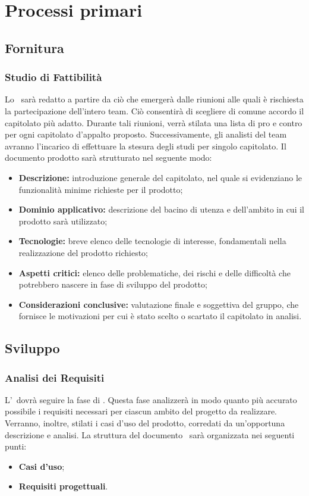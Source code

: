 \newpage
\section{Processi primari}

\subsection{Fornitura}

\subsubsection{Studio di Fattibilità}
Lo \SdF\ sarà redatto a partire da ciò che emergerà dalle riunioni alle quali è rischiesta la partecipazione dell'intero team. Ciò consentirà di scegliere di comune accordo il capitolato più adatto. Durante tali riunioni, verrà stilata una lista di pro e contro per ogni capitolato d'appalto proposto. Successivamente, gli analisti del team avranno l'incarico di effettuare la stesura degli studi per singolo capitolato. Il documento prodotto sarà strutturato nel seguente modo:

\begin{itemize}
	\item \textbf{Descrizione:} introduzione generale del capitolato, nel quale si evidenziano le funzionalità minime richieste per il prodotto;
	\item \textbf{Dominio applicativo:} descrizione del bacino di utenza e dell'ambito in cui il prodotto sarà utilizzato;
	\item \textbf{Tecnologie:} breve elenco delle tecnologie di interesse, fondamentali nella realizzazione del prodotto richiesto;
	\item \textbf{Aspetti critici:} elenco delle problematiche, dei rischi e delle difficoltà che potrebbero nascere in fase di sviluppo del prodotto;
	\item \textbf{Considerazioni conclusive:} valutazione finale e soggettiva del gruppo, che fornisce le motivazioni per cui è stato scelto o scartato il capitolato in analisi.
\end{itemize}

\subsection{Sviluppo}

\subsubsection{Analisi dei Requisiti}
L'\AdR\ dovrà seguire la fase di \SdF. Questa fase analizzerà in modo quanto più accurato possibile i requisiti necessari per ciascun ambito del progetto da realizzare. Verranno, inoltre, stilati i casi d'uso del prodotto, corredati da un'opportuna descrizione e analisi. La struttura del documento \AdR\ sarà organizzata nei seguenti punti:
\begin{itemize}
	\item \textbf{Casi d'uso};
	\item \textbf{Requisiti progettuali}.
\end{itemize}

